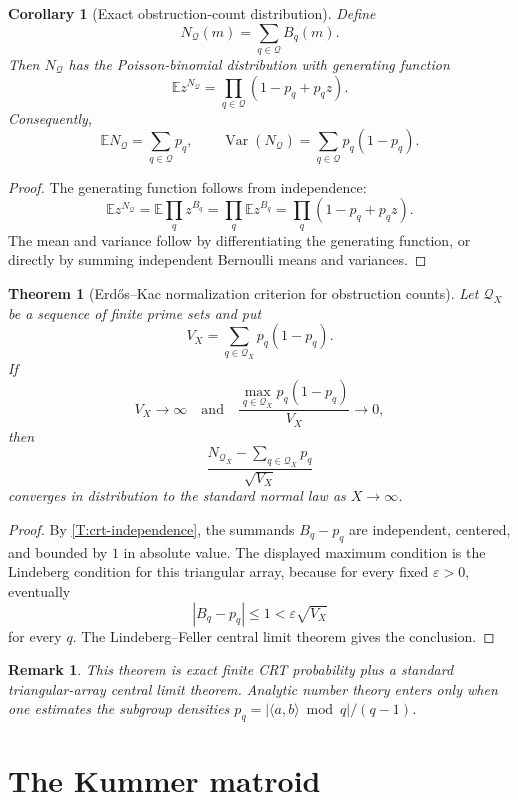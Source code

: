 \documentclass[11pt]{article}
\newtheorem{theorem}{Theorem}
\newtheorem{corollary}{Corollary}
\newtheorem{remark}{Remark}
\newcommand{\E}{\mathbb E}
\newcommand{\Var}{\operatorname{Var}}
\begin{document}
\begin{corollary}[Exact obstruction-count distribution]\label{C:poisson-binomial}
Define
\[
N_{\mathcal Q}(m)=\sum_{q\in\mathcal Q}B_q(m).
\]
Then \(N_{\mathcal Q}\) has the Poisson-binomial distribution with generating function
\[
\E z^{N_{\mathcal Q}}
=
\prod_{q\in\mathcal Q}(1-p_q+p_qz).
\]
Consequently,
\[
\E N_{\mathcal Q}=\sum_{q\in\mathcal Q}p_q,
\qquad
\Var(N_{\mathcal Q})=\sum_{q\in\mathcal Q}p_q(1-p_q).
\]
\end{corollary}

\begin{proof}
The generating function follows from independence:
\[
\E z^{N_{\mathcal Q}}
=
\E\prod_q z^{B_q}
=
\prod_q\E z^{B_q}
=
\prod_q(1-p_q+p_qz).
\]
The mean and variance follow by differentiating the generating function, or directly by summing independent Bernoulli means and variances.
\end{proof}

\begin{theorem}[Erd\H{o}s--Kac normalization criterion for obstruction counts]\label{T:ek-criterion}
Let \(\mathcal Q_X\) be a sequence of finite prime sets and put
\[
V_X=\sum_{q\in\mathcal Q_X}p_q(1-p_q).
\]
If
\[
V_X\to\infty
\quad\text{and}\quad
\frac{\max_{q\in\mathcal Q_X}p_q(1-p_q)}{V_X}\to0,
\]
then
\[
\frac{N_{\mathcal Q_X}-\sum_{q\in\mathcal Q_X}p_q}{\sqrt{V_X}}
\]
converges in distribution to the standard normal law as \(X\to\infty\).
\end{theorem}

\begin{proof}
By \cref{T:crt-independence}, the summands \(B_q-p_q\) are independent, centered, and bounded by \(1\) in absolute value.  The displayed maximum condition is the Lindeberg condition for this triangular array, because for every fixed \(\varepsilon>0\), eventually
\[
|B_q-p_q|\le1<\varepsilon\sqrt{V_X}
\]
for every \(q\).  The Lindeberg--Feller central limit theorem gives the conclusion.
\end{proof}

\begin{remark}
This theorem is exact finite CRT probability plus a standard triangular-array central limit theorem.  Analytic number theory enters only when one estimates the subgroup densities \(p_q=|\langle a,b\rangle\bmod q|/(q-1)\).
\end{remark}

\section{The Kummer matroid}
\end{document}
